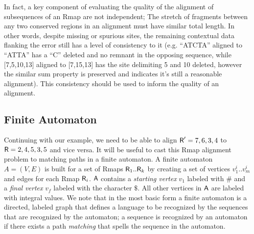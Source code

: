In fact, a key component of evaluating the quality of the alignment of subsequences of an Rmap are not independent; The stretch of fragments between any two conserved regions in an alignment must have similar total length.  In other words, despite missing or spurious sites, the remaining contextual data flanking the error still has a level of consistency to it (e.g. ``ATCTA'' aligned to ``ATTA'' has a ``C'' deleted and no remnant in the opposing sequence, while [7,5,10,13] aligned to [7,15,13] has the site delimiting 5 and 10 deleted, however the similar sum property is preserved and indicates it's still a reasonable alignment).  This consistency should be used to inform the quality of an alignment.

\subsection{Finite Automaton}


Continuing with our example, we need to be able to align $\mbox{\rm {\sf R}}' = 7,6,3,4$ to $\mbox{\rm {\sf R}} = 2,4,5,3,5$ and vice versa.  It will be useful to cast this Rmap alignment problem to matching paths in a finite automaton.   A finite automaton $A = (V, E)$ is built for a set of Rmaps $\mbox{\rm {\sf R}}_1..\mbox{\rm {\sf R}}_k$ by creating a set of vertices $v^i_1 .. v^i_m$ and edges for each Rmap $\mbox{\rm {\sf R}}_i$.  $\mathsf{A}$ contains a {\em starting vertex} $v_1$ labeled with $\#$ and a {\em final vertex} $v_f$ labeled with the character $\$$.  All other vertices in $\mathsf{A}$ are labeled with integral values.    We note that in the most basic form a finite automaton is  a directed, labeled graph that defines a language to be recognized by the sequences that are recognized by the automaton; a sequence is recognized by an automaton if there exists a path {\em matching} that spells the sequence in the automaton.


